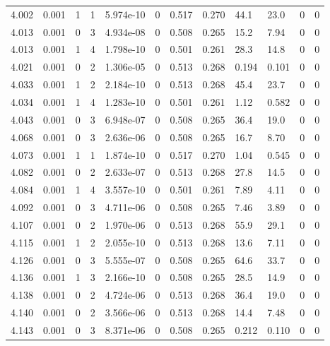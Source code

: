\documentclass[preview]{standalone}
\begin{document}
{{{{{{{{{{\begin{tabular}{L{1.2cm}C{1.2cm} C{0.3cm}C{0.5cm} C{1.4cm}C{1.4cm} C{1.4cm}C{1.4cm} C{1.6cm}C{1.6cm} C{1.6cm}C{1.6cm}}
  4.002  &  0.001  & 1     &  1 &  5.974e-10  & 0  &  0.517&   0.270& 44.1 & 23.0   &  0 & 0  \\ 
  4.013  &  0.001  & 0     &  3 &  4.934e-08  & 0  &  0.508&   0.265& 15.2 & 7.94   &  0 & 0  \\ 
  4.013  &  0.001  & 1     &  4 &  1.798e-10  & 0  &  0.501&   0.261& 28.3 & 14.8   &  0 & 0  \\ 
  4.021  &  0.001  & 0     &  2 &  1.306e-05  & 0  &  0.513&   0.268& 0.194 & 0.101   &  0 & 0  \\ 
  4.033  &  0.001  & 1     &  2 &  2.184e-10  & 0  &  0.513&   0.268& 45.4 & 23.7   &  0 & 0  \\ 
  4.034  &  0.001  & 1     &  4 &  1.283e-10  & 0  &  0.501&   0.261& 1.12 & 0.582   &  0 & 0  \\ 
  4.043  &  0.001  & 0     &  3 &  6.948e-07  & 0  &  0.508&   0.265& 36.4 & 19.0   &  0 & 0  \\ 
  4.068  &  0.001  & 0     &  3 &  2.636e-06  & 0  &  0.508&   0.265& 16.7 & 8.70   &  0 & 0  \\ 
  4.073  &  0.001  & 1     &  1 &  1.874e-10  & 0  &  0.517&   0.270& 1.04 & 0.545   &  0 & 0  \\ 
  4.082  &  0.001  & 0     &  2 &  2.633e-07  & 0  &  0.513&   0.268& 27.8 & 14.5   &  0 & 0  \\ 
  4.084  &  0.001  & 1     &  4 &  3.557e-10  & 0  &  0.501&   0.261& 7.89 & 4.11   &  0 & 0  \\ 
  4.092  &  0.001  & 0     &  3 &  4.711e-06  & 0  &  0.508&   0.265& 7.46 & 3.89   &  0 & 0  \\ 
  4.107  &  0.001  & 0     &  2 &  1.970e-06  & 0  &  0.513&   0.268& 55.9 & 29.1   &  0 & 0  \\ 
  4.115  &  0.001  & 1     &  2 &  2.055e-10  & 0  &  0.513&   0.268& 13.6 & 7.11   &  0 & 0  \\ 
  4.126  &  0.001  & 0     &  3 &  5.555e-07  & 0  &  0.508&   0.265& 64.6 & 33.7   &  0 & 0  \\ 
  4.136  &  0.001  & 1     &  3 &  2.166e-10  & 0  &  0.508&   0.265& 28.5 & 14.9   &  0 & 0  \\ 
  4.138  &  0.001  & 0     &  2 &  4.724e-06  & 0  &  0.513&   0.268& 36.4 & 19.0   &  0 & 0  \\ 
  4.140  &  0.001  & 0     &  2 &  3.566e-06  & 0  &  0.513&   0.268& 14.4 & 7.48   &  0 & 0  \\ 
  4.143  &  0.001  & 0     &  3 &  8.371e-06  & 0  &  0.508&   0.265& 0.212 & 0.110   &  0 & 0  \\ 

\end{tabular}}}}}}}}}}}
\end{document}
